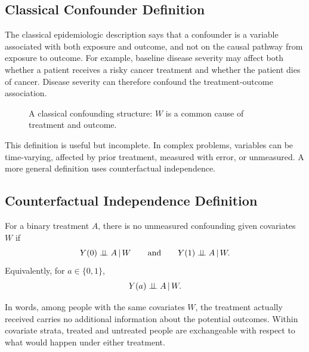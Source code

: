 \label{lec:3-2}

\subsection{Classical Confounder Definition}

The classical epidemiologic description says that a confounder is a variable associated with both exposure and outcome, and not on the causal pathway from exposure to outcome. For example, baseline disease severity may affect both whether a patient receives a risky cancer treatment and whether the patient dies of cancer. Disease severity can therefore confound the treatment-outcome association.

\begin{figure}[H]
\centering
{}
\caption{A classical confounding structure: $W$ is a common cause of treatment and outcome.}
\end{figure}

This definition is useful but incomplete. In complex problems, variables can be time-varying, affected by prior treatment, measured with error, or unmeasured. A more general definition uses counterfactual independence.

\subsection{Counterfactual Independence Definition}

\begin{definition}
For a binary treatment $A$, there is no unmeasured confounding given covariates $W$ if
\[
Y(0) \perp\!\!\!\perp A \,\vert\, W
\qquad\text{and}\qquad
Y(1) \perp\!\!\!\perp A \,\vert\, W.
\]
Equivalently, for $a\in\{0,1\}$,
\[
Y(a)\perp\!\!\!\perp A\,\vert\, W.
\]
\end{definition}

In words, among people with the same covariates $W$, the treatment actually received carries no additional information about the potential outcomes. Within covariate strata, treated and untreated people are exchangeable with respect to what would happen under either treatment.

